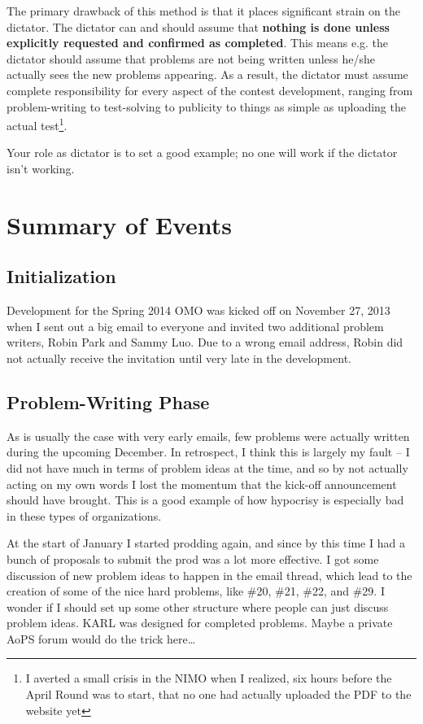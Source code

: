 \documentclass[11pt]{scrreprt}
\begin{document}
The primary drawback of this method is that it places significant strain on the dictator. The dictator can and should assume that \textbf{nothing is done unless explicitly requested and confirmed as completed}. This means {e.g.} the dictator should assume that problems are not being written unless he/she actually sees the new problems appearing. As a result, the dictator must assume complete responsibility for every aspect of the contest development, ranging from problem-writing to test-solving to publicity to things as simple as uploading the actual test\footnote{I averted a small crisis in the NIMO when I realized, six hours before the April Round was to start, that no one had actually uploaded the PDF to the website yet}.

Your role as dictator is to set a good example; no one will work if the dictator isn't working.

\chapter{Summary of Events}
\section{Initialization}
Development for the Spring 2014 OMO was kicked off on November 27, 2013 when I sent out a big email to everyone and invited two additional problem writers, Robin Park and Sammy Luo.
Due to a wrong email address, Robin did not actually receive the invitation until very late in the development.

\section{Problem-Writing Phase}
As is usually the case with very early emails, few problems were actually written during the upcoming December.
In retrospect, I think this is largely my fault -- I did not have much in terms of problem ideas at the time,
and so by not actually acting on my own words I lost the momentum that the kick-off announcement should have brought.
This is a good example of how hypocrisy is especially bad in these types of organizations.

At the start of January I started prodding again, and since by this time I had a bunch of proposals to submit
the prod was a lot more effective.
I got some discussion of new problem ideas to happen in the email thread, which lead to the creation of some
of the nice hard problems, like \#20, \#21, \#22, and \#29.
I wonder if I should set up some other structure where people can just discuss problem ideas.
KARL was designed for completed problems.
Maybe a private AoPS forum would do the trick here\dots
\end{document}
